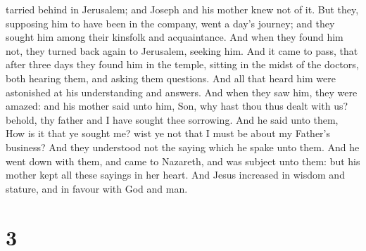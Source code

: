 tarried behind in Jerusalem; and Joseph and his mother knew not of it.
 But they, supposing him to have been in the company, went
a day's journey; and they sought him among their kinsfolk and
acquaintance.  And when they found him not, they turned
back again to Jerusalem, seeking him.  And it came to pass,
that after three days they found him in the temple, sitting in the midst
of the doctors, both hearing them, and asking them questions.
 And all that heard him were astonished at his
understanding and answers.  And when they saw him, they
were amazed: and his mother said unto him, Son, why hast thou thus dealt
with us? behold, thy father and I have sought thee sorrowing.
 And he said unto them, How is it that ye sought me? wist
ye not that I must be about my Father's business?  And they
understood not the saying which he spake unto them.  And he
went down with them, and came to Nazareth, and was subject unto them:
but his mother kept all these sayings in her heart.  And
Jesus increased in wisdom and stature, and in favour with God and man.

\hypertarget{section-2}{%
\section{3}\label{section-2}}

